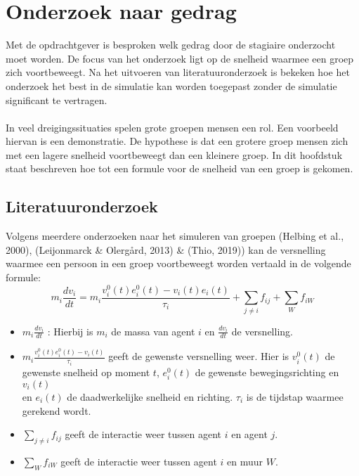 \documentclass[12pt, letterpaper]{article}
\begin{document}
\newpage
\section{Onderzoek naar gedrag} \label{gedrag}
Met de opdrachtgever is besproken welk gedrag door de stagiaire onderzocht moet worden. De focus van het onderzoek ligt op de snelheid waarmee een groep zich voortbeweegt. Na het uitvoeren van literatuuronderzoek is bekeken hoe het onderzoek het best in de simulatie kan worden toegepast zonder de simulatie significant te vertragen.
\\ \\
In veel dreigingssituaties spelen grote groepen mensen een rol. Een voorbeeld hiervan is een demonstratie. De hypothese is dat een grotere groep mensen zich met een lagere snelheid voortbeweegt dan een kleinere groep. In dit hoofdstuk staat beschreven hoe tot een formule voor de snelheid van een groep is gekomen.
\subsection{Literatuuronderzoek}

Volgens meerdere onderzoeken naar het simuleren van groepen (Helbing et al., 2000), (Leijonmarck \& Olergård, 2013) \& (Thio, 2019)) kan de versnelling waarmee een persoon in een groep voortbeweegt worden vertaald in de volgende formule:
\begin{equation} \label{hoofdeq}
    m_{i} \frac{dv_{i}}{dt} = m_{i} \frac{v_{i}^{0}(t)e_{i}^{0}(t) - v_{i}(t)e_{i}(t)}{\tau_{i}} + \displaystyle\sum_{j \neq i} f_{ij} + \displaystyle\sum_{W} f_{iW}
\end{equation}
\begin{center}
\begin{itemize}
\centering
    \item $m_{i} \frac{dv_{i}}{dt}$ : Hierbij is $m_{i}$ de massa van agent $i$ en $\frac{dv_{i}}{dt}$ de versnelling.
    \item $ m_{i} \frac{v_{i}^{0}(t)e_{i}^{0}(t) - v_{i}(t)}{\tau_{i}}$ geeft de gewenste versnelling weer. Hier is $v_{i}^{0}(t)$ de \\ gewenste snelheid op moment $t$, $e_{i}^{0}(t)$ de gewenste bewegingsrichting en $v_{i}(t)$ \\ en $e_{i}(t)$ de daadwerkelijke snelheid en richting. $\tau_{i}$ is de tijdstap waarmee gerekend wordt.
    \item $\displaystyle\sum_{j \neq i} f_{ij}$ geeft de interactie weer tussen agent $i$ en agent $j$.
    \item $\displaystyle\sum_{W} f_{iW}$ geeft de interactie weer tussen agent $i$ en muur $W$.
\end{itemize}
\end{center}
\end{document}
